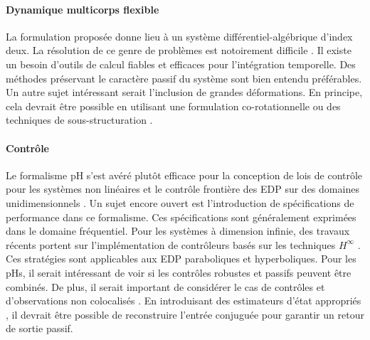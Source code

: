 \paragraph{Dynamique multicorps flexible}
La formulation proposée donne lieu à un système différentiel-algébrique d'index deux. La résolution de ce genre de problèmes est notoirement difficile \cite{brenan1995dae}. Il existe un besoin d'outils de calcul fiables et efficaces pour l'intégration temporelle. Des méthodes préservant le caractère passif du système sont bien entendu préférables. \\ Un autre sujet intéressant serait l'inclusion de grandes déformations. En principe, cela devrait être possible en utilisant une formulation co-rotationnelle ou des techniques de sous-structuration \cite{wu1988substructuring}.

\paragraph{Contrôle}
Le formalisme pH s'est avéré plutôt efficace pour la conception de lois de contrôle pour les systèmes non linéaires \cite{ortega2004survey} et le contrôle frontière des EDP sur des domaines unidimensionnels \cite{macchelli2020exponential}. Un sujet encore ouvert est l'introduction de spécifications de performance dans ce formalisme. Ces spécifications sont généralement exprimées dans le domaine fréquentiel. Pour les systèmes à dimension infinie, des travaux récents portent sur l'implémentation de contrôleurs basés sur les techniques $ H^\infty $ \cite{apkarian2018structured,apkarian2020bd}. Ces stratégies sont applicables aux EDP paraboliques et hyperboliques. Pour les pHs, il serait intéressant de voir si les contrôles robustes et passifs peuvent être combinés. De plus, il serait important de considérer le cas de contrôles et d'observations non colocalisés \cite{cardoso2016}. En introduisant des estimateurs d'état appropriés \cite{yaghmaei2019}, il devrait être possible de reconstruire l'entrée conjuguée pour garantir un retour de sortie passif.

